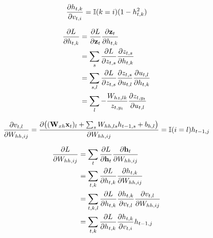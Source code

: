 \begin{equation}
    \frac{\partial h_{t,k}}{\partial v_{t,i}} = {\mathbb{I}}(k=i)(1-h_{t,k}^2)
\end{equation}

\begin{equation}
\begin{split}
    \frac{\partial L}{\partial h_{t,k}}
        &= \frac{\partial L}{\partial {\mathbf{z}}_t} \frac{\partial {\mathbf{z}}_t}{\partial h_{t,k}} \\
        &= \sum_{s} \frac{\partial L}{\partial z_{t,s}} \frac{\partial z_{t,s}}{\partial h_{t,k}} \\
        &= \sum_{s,l} \frac{\partial L}{\partial z_{t,s}} \frac{\partial z_{t,s}}{\partial u_{t,l}}\frac{\partial u_{t,l}}{\partial h_{t,k}} \\
        &= \sum_{l} -\frac{W_{hz,lk}}{z_{t,{y_t}}} \frac{\partial z_{t,{y_t}}}{\partial u_{t,l}} \\
\end{split}
\end{equation}

\begin{equation}
    \frac{\partial v_{t,l}}{\partial W_{hh,ij}}
        = \frac{\partial \big(({\mathbf{W}}_{xh}{\mathbf{x}}_t)_l+\sum_s W_{hh,ls}h_{t-1,s}+b_{h,l}\big)}{\partial W_{hh,ij}}
        = {\mathbb{I}}(i=l)h_{t-1,j}
\end{equation}

\begin{equation}
\begin{split}
    \frac{\partial L}{\partial W_{hh,ij}}
        &= \sum_t \frac{\partial L}{\partial {\mathbf{h}}_t} \frac{\partial {\mathbf{h}}_t}{\partial W_{hh,ij}} \\
        &= \sum_{t,k} \frac{\partial L}{\partial h_{t,k}} \frac{\partial h_{t,k}}{\partial W_{hh,ij}} \\
        &= \sum_{t,k,l} \frac{\partial L}{\partial h_{t,k}} \frac{\partial h_{t,k}}{\partial v_{t,l}}\frac{\partial v_{t,l}}{\partial W_{hh,ij}} \\
        &= \sum_{t,k} \frac{\partial L}{\partial h_{t,k}} \frac{\partial h_{t,k}}{\partial v_{t,i}}h_{t-1,j} \\
\end{split}
\end{equation}
